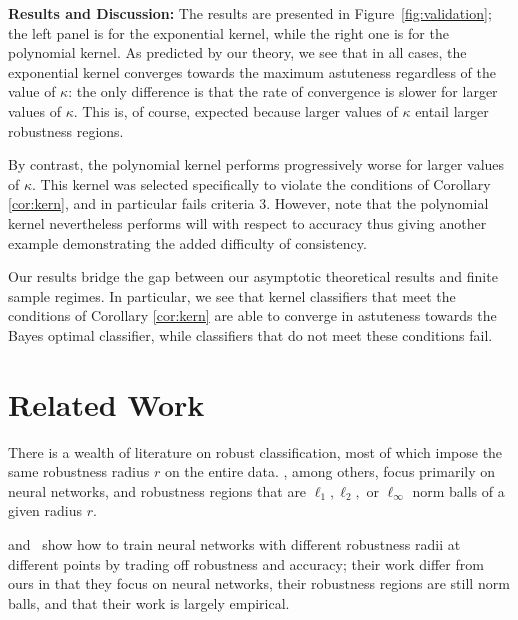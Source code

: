 \textbf{Results and Discussion:} The results are presented in Figure~\ref{fig:validation}; the left panel is for the exponential kernel, while the right one is for the polynomial kernel. As predicted by our theory, we see that in all cases, the exponential kernel converges towards the maximum astuteness regardless of the value of $\kappa$: the only difference is that the rate of convergence is slower for larger values of $\kappa$. This is, of course, expected because larger values of $\kappa$ entail larger robustness regions. 

By contrast, the polynomial kernel performs progressively worse for larger values of $\kappa$. This kernel was selected specifically to violate the conditions of Corollary \ref{cor:kern}, and in particular fails criteria 3. However, note that the polynomial kernel nevertheless performs will with respect to accuracy thus giving another example demonstrating the added difficulty of \ncons\emph{ }consistency.

Our results bridge the gap between our asymptotic theoretical results and finite sample regimes. In particular, we see that kernel classifiers that meet the conditions of Corollary \ref{cor:kern} are able to converge in astuteness towards the \natural\emph{ }Bayes optimal classifier, while classifiers that do not meet these conditions fail.

\section{Related Work}\label{sec:rel_work}

There is a wealth of literature on robust classification, most of which impose the same robustness radius $r$ on the entire data.  \cite{Carlini17, Liu17, Papernot17, Papernot16,Szegedy14, Hein17,Katz17,Schmidt18,Wu16,Steinhardt18, Sinha18}, among others, focus primarily on neural networks, and robustness regions that are $\ell_1, \ell_2, $ or $\ell_\infty$ norm balls of a given radius $r$. 

\cite{Cheng20} and~\cite{Ding20} show how to train neural networks with different robustness radii at different points by trading off robustness and accuracy; their work differ from ours in that they focus on neural networks, their robustness regions are still norm balls, and that their work is largely empirical.

